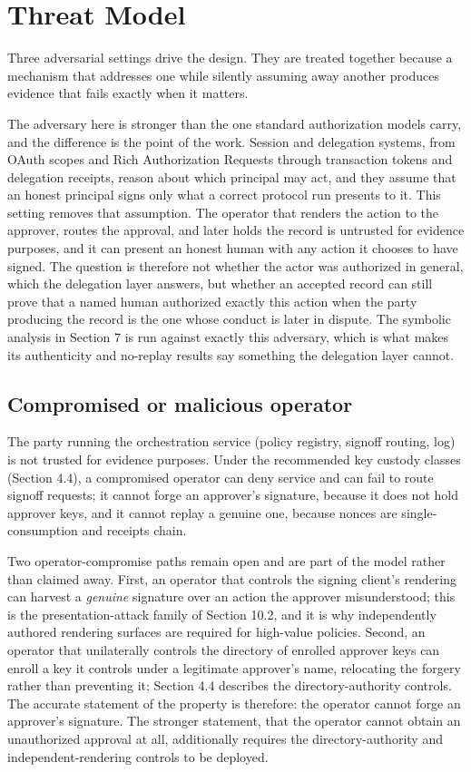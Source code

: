 \documentclass[11pt]{article}
\begin{document}
\section{Threat Model}

Three adversarial settings drive the design. They are treated together because a
mechanism that addresses one while silently assuming away another produces
evidence that fails exactly when it matters.

The adversary here is stronger than the one standard authorization models carry,
and the difference is the point of the work. Session and delegation systems, from
OAuth scopes and Rich Authorization Requests through transaction tokens and
delegation receipts, reason about which principal may act, and they assume that an
honest principal signs only what a correct protocol run presents to it. This
setting removes that assumption. The operator that renders the action to the
approver, routes the approval, and later holds the record is untrusted for
evidence purposes, and it can present an honest human with any action it chooses
to have signed. The question is therefore not whether the actor was authorized in
general, which the delegation layer answers, but whether an accepted record can
still prove that a named human authorized exactly this action when the party
producing the record is the one whose conduct is later in dispute. The symbolic
analysis in Section 7 is run against exactly this adversary, which is what makes
its authenticity and no-replay results say something the delegation layer cannot.

\subsection{Compromised or malicious operator}

The party running the orchestration service (policy registry, signoff routing,
log) is not trusted for evidence purposes. Under the recommended key custody
classes (Section 4.4), a compromised operator can deny service and can fail to
route signoff requests; it cannot forge an approver's signature, because it does
not hold approver keys, and it cannot replay a genuine one, because nonces are
single-consumption and receipts chain.

Two operator-compromise paths remain open and are part of the model rather than
claimed away. First, an operator that controls the signing client's rendering can
harvest a \emph{genuine} signature over an action the approver misunderstood; this
is the presentation-attack family of Section 10.2, and it is why independently
authored rendering surfaces are required for high-value policies. Second, an
operator that unilaterally controls the directory of enrolled approver keys can
enroll a key it controls under a legitimate approver's name, relocating the
forgery rather than preventing it; Section 4.4 describes the directory-authority
controls. The accurate statement of the property is therefore: the operator
cannot forge an approver's signature. The stronger statement, that the operator
cannot obtain an unauthorized approval at all, additionally requires the
directory-authority and independent-rendering controls to be deployed.
\end{document}
